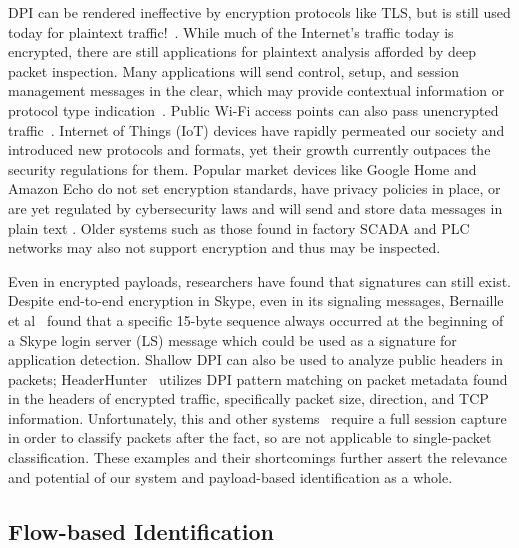 DPI can be rendered ineffective by encryption protocols like TLS, but is still used today for plaintext traffic!~\cite{ZHAO202122}. While much of the Internet's traffic today is encrypted, there are still applications for plaintext analysis afforded by deep packet inspection. Many applications will send control, setup, and session management messages in the clear, which may provide contextual information or protocol type indication~\cite{Hasanzadeh, Ogudo, Zhang}. Public Wi-Fi access points can also pass unencrypted traffic~\cite{Maimon}. Internet of Things (IoT) devices have rapidly permeated our society and introduced new protocols and formats, yet their growth currently outpaces the security regulations for them. Popular market devices like Google Home and Amazon Echo do not set encryption standards, have privacy policies in place, or are yet regulated by cybersecurity laws and will send and store data messages in plain text \cite{2017cleartext, Capellupo, WangYong}. Older systems such as those found in factory SCADA and PLC networks may also not support encryption \cite{Malaka} and thus may be inspected.

Even in encrypted payloads, researchers have found that signatures can still exist. Despite end-to-end encryption in Skype, even in its signaling messages, Bernaille et al~\cite{Bernaille} found that a specific 15-byte sequence always occurred at the beginning of a Skype login server (LS) message which could be used as a signature for application detection. Shallow DPI can also be used to analyze public headers in packets; HeaderHunter~\cite{HeaderHunter} utilizes DPI pattern matching on packet metadata found in the headers of encrypted traffic, specifically packet size, direction, and TCP information. Unfortunately, this and other systems~\cite{Moore2013DiscriminatorsFU, Roughan} require a full session capture in order to classify packets after the fact, so are not applicable to single-packet classification. These examples and their shortcomings further assert the relevance and potential of our system and payload-based identification as a whole.

\subsection{Flow-based Identification}

